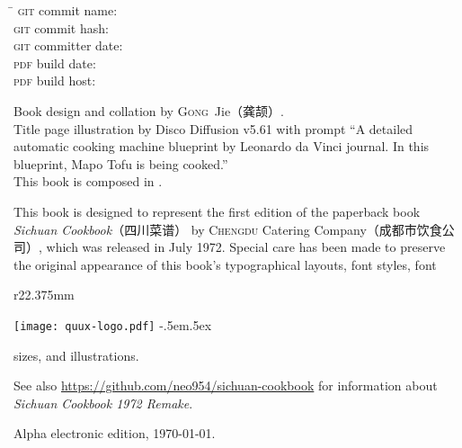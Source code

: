 \endgroup

\vfill

\setlength{\parskip}{.3125\baselineskip}%
\vspace{-2\baselineskip}
\begin{tabbing}
\hspace{9.5625em}\= \kill
\textsc{git} commit name:       \>\texttt{\gitcommitname}\\
\textsc{git} commit hash:       \>\texttt{\gitcommithash}\\
\textsc{git} committer date:    \>\texttt{\gitcommitterdate}\\
\textsc{pdf} build date:        \>\texttt{\pdfbuilddate}\\
\textsc{pdf} build host:        \>\texttt{\pdfbuildhost}
\end{tabbing}
\vspace{-1\baselineskip}

Book design and collation by \textsc{Gong}~Jie\!（龚颉）\!\!\!.\\
Title page illustration by Disco Diffusion v5.61 with prompt ``A detailed
automatic cooking machine blueprint by Leonardo da Vinci journal. In this
blueprint, Mapo Tofu is being cooked.''\\
This book is composed in \XeLaTeX.

This book is designed to represent the first edition of the paperback book
\textit{Sichuan Cookbook}{\kafamily（四川菜谱）}\!\!\! by \textsc{Chengdu}
Catering Company\!（成都市饮食公司）\!\!\!, which was released in July 1972.
Special care has been made to preserve the original appearance of this book's
typographical layouts, font styles, font
\begin{wrapfigure}{r}{22.375mm}%
\vspace{-1.25\baselineskip}%
\begin{flushright}%
\texttt{[image: quux-logo.pdf]}%
{\sffamily\tiny\kern-.5em\lower.5ex\hbox{\texttrademark}}%
\end{flushright}%
\vspace{-1.75\baselineskip}%
\end{wrapfigure}%
sizes, and illustrations.

See also \url{https://github.com/neo954/sichuan-cookbook} for information
about \textit{Sichuan Cookbook 1972 Remake}.

Alpha electronic edition, \today.

\endgroup%


